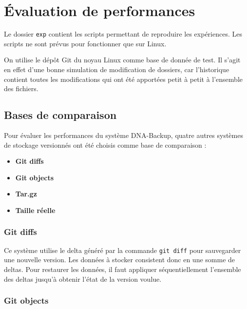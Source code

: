 \documentclass[a4paper]{report}
\begin{document}
\chapter{Évaluation de performances}

Le dossier \verb|exp| contient les scripts permettant de reproduire
les expériences. Les scripts ne sont prévus pour fonctionner que sur
Linux.

On utilise le dépôt Git du noyau Linux comme base de donnée de test. Il
s'agit en effet d'une bonne simulation de modification de dossiers, car
l'historique contient toutes les modifications qui ont été apportées
petit à petit à l'ensemble des fichiers.

\section{Bases de comparaison}

Pour évaluer les performances du système DNA-Backup, quatre autres
systèmes de stockage versionnés ont été choisis comme base de
comparaison :

\begin{itemize}
\item
  \textbf{Git diffs}
\item
  \textbf{Git objects}
\item
  \textbf{Tar.gz}
\item
  \textbf{Taille réelle}
\end{itemize}

\subsection{Git diffs}

Ce système utilise le delta généré par la commande \verb|git diff|
pour sauvegarder une nouvelle version. Les données à stocker consistent
donc en une somme de deltas. Pour restaurer les données, il faut
appliquer séquentiellement l'ensemble des deltas jusqu'à obtenir l'état
de la version voulue.

\subsection{Git objects}
\end{document}

